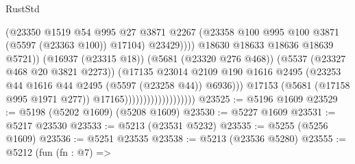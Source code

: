 \begin{lexlean}{RustStd}
\begin{coremodule}
                                                      (@23350
                                                        @1519
                                                        @54
                                                        @995
                                                        @27
                                                        @3871
                                                        @2267
                                                        (@23358
                                                          @100
                                                          @995
                                                          @100
                                                          @3871
                                                          (@5597 (@23363 @100))
                                                          @17104)
                                                        @23429))))
                                                @18630
                                                @18633
                                                @18636
                                                @18639
                                                @5721))
                                            (@16937 (@23315 @18))
                                            (@5681 (@23320 @276 @468))
                                            (@5537 (@23327 @468 @20 @3821 @2273))
                                            (@17135
                                              @23014
                                              @2109
                                              @190
                                              @1616
                                              @2495
                                              (@23253
                                                @44
                                                @1616
                                                @44
                                                @2495
                                                (@5597 (@23258 @44))
                                                @6936)))
                                          @17153
                                          (@5681 (@17158 @995 @1971 @277))
                                          @17165)))))))))))))))))))
@23525 := @5196 @1609
@23529 := @5198 (@5202 @1609) (@5208 @1609)
@23530 := @5227 @1609
@23531 := @5217 @23530
@23533 := @5213 (@23531 @5232)
@23535 := @5255 (@5256 @1609)
@23536 := @5251 @23535
@23538 := @5213 (@23536 @5280)
@23555 := @5212
    (fun (fn : @7) =>

\end{coremodule}
\end{lexlean}
